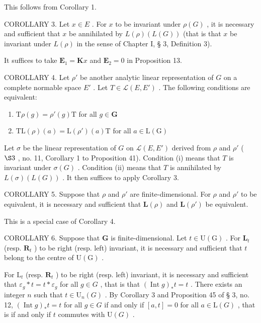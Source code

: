 This follows from Corollary 1.

COROLLARY 3. Let \(x \in E\) . For \(x\) to be invariant under \(\rho(G)\) , it is necessary and sufficient that \(x\) be annihilated by \(L(\rho)(L(G))\) (that is that \(x\) be invariant under \(L(\rho)\) in the sense of Chapter I, § 3, Definition 3).

It suffices to take \(\mathbf{E}_1 = \mathbf{K}x\) and \(\mathbf{E}_2 = 0\) in Proposition 13.

COROLLARY 4. Let \(\rho'\) be another analytic linear representation of \(G\) on a complete normable space \(E'\) . Let \(T \in \mathcal{L}(E, E')\) . The following conditions are equivalent:

\begin{enumerate}
\def\labelenumi{(\roman{enumi})}
\item
  \(\mathrm{T}\rho (g) = \rho '(g)\mathrm{T}\) for all \(g\in \mathbf{G}\)
\item
  \(\mathrm{TL}(\rho)(a) = \mathrm{L}(\rho')(a)\mathrm{T}\) for all \(a\in \mathrm{L}(\mathrm{G})\)
\end{enumerate}

Let \(\sigma\) be the linear representation of \(G\) on \(\mathcal{L}(E, E')\) derived from \(\rho\) and \(\rho'\) ( \(\S 3\) , no. 11, Corollary 1 to Proposition 41). Condition (i) means that \(T\) is invariant under \(\sigma(G)\) . Condition (ii) means that \(T\) is annihilated by \(L(\sigma)(L(G))\) . It then suffices to apply Corollary 3.

COROLLARY 5. Suppose that \(\rho\) and \(\rho'\) are finite-dimensional. For \(\rho\) and \(\rho'\) to be equivalent, it is necessary and sufficient that \(\mathbf{L}(\rho)\) and \(\mathbf{L}(\rho')\) be equivalent.

This is a special case of Corollary 4.

COROLLARY 6. Suppose that \(\mathbf{G}\) is finite-dimensional. Let \(t \in \mathrm{U}(\mathrm{G})\) . For \(\mathbf{L}_t\) (resp. \(\mathbf{R}_t\) ) to be right (resp. left) invariant, it is necessary and sufficient that \(t\) belong to the centre of \(\mathrm{U}(\mathrm{G})\) .

For \(\mathrm{L}_t\) (resp. \(\mathbf{R}_t\) ) to be right (resp. left) invariant, it is necessary and sufficient that \(\varepsilon_g * t = t * \varepsilon_g\) for all \(g \in G\) , that is that \((\operatorname{Int} g)_* t = t\) . There exists an integer \(n\) such that \(t \in \mathrm{U}_n(G)\) . By Corollary 3 and Proposition 45 of § 3, no. 12, \((\operatorname{Int} g)_* t = t\) for all \(g \in G\) if and only if \([a, t] = 0\) for all \(a \in \mathrm{L}(G)\) , that is if and only if \(t\) commutes with \(\mathrm{U}(G)\) .


